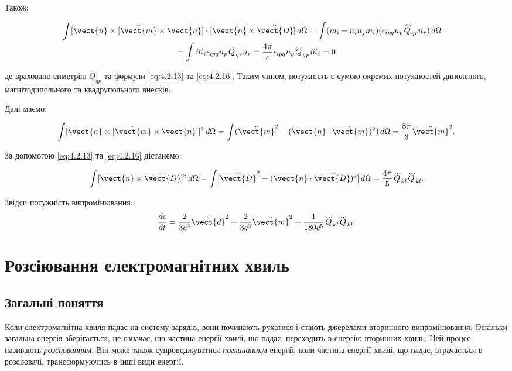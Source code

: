 Також:

\begin{multline*}
\int [\vect{n} \times [\ddot{\vect{m}}\times\vect{n}] \cdot [\vect{n} \times \dddot{\vect{D}}] \, d\Omega = \int (m_i - n_i n_j m_i)
(\epsilon_{ipq} n_p \tilde{\dddot{Q}}_{qr} n_r) \, d\Omega = \\ = \int \dddot{m}_i\epsilon_{ipq} n_p \dddot{Q}_{qr} n_r =
\frac{4\pi}c \epsilon_{ipq} n_p \dddot{Q}_{qp}\dddot{m}_i = 0
\end{multline*}

де враховано симетрію \( Q_{qp} \) та формули \eqref{eq:4.2.13} та \eqref{eq:4.2.16}. Таким чином, потужність є сумою окремих потужностей дипольного,
магнітодипольного та
квадрупольного внесків.

Далі маємо:

\begin{equation*}
\int [\vect{n} \times [\ddot{\vect{m}}\times\vect{n}]]^2 \, d\Omega = \int (\ddot{\vect{m}}^2 - (\vect{n} \cdot \ddot{\vect{m}})^2) \, d\Omega =
\frac{8\pi}{3} \ddot{\vect{m}}^2.
\end{equation*}

За допомогою \eqref{eq:4.2.13} та \eqref{eq:4.2.16}  дістанемо:

\begin{equation*}
\int [\vect{n} \times \dddot{\vect{D}}]^2 \, d\Omega = \int [\dddot{\vect{D}}^2 - (\vect{n} \cdot \dddot{\vect{D}})^2] \, d\Omega = \frac{4\pi}{5}
\dddot{Q}_{kl} \dddot{Q}_{kl}.
\end{equation*}

Звідси потужність випромінювання:
\begin{equation*}
    \frac{d\epsilon}{dt} = \frac2{3c^3}\ddot{\vect{d}}^2+
    \frac2{3c^3}\ddot{\vect{m}}^2+
    \frac1{180c^5}\dddot{Q}_{kl} \dddot{Q}_{kl}.
\end{equation*}

\section{Розсіювання електромагнітних хвиль}

\subsection*{Загальні поняття}

Коли електромагнітна хвиля падає на систему зарядів, вони починають рухатися і стають джерелами вторинного випромінювання. Оскільки загальна енергія
зберігається, це означає, що частина енергії хвилі, що падає, переходить в енергію вторинних хвиль. Цей процес називають \textit{розсіюванням}. Він може
також супроводжуватися \textit{поглинанням} енергії, коли частина енергії хвилі, що падає, втрачається в розсіювачі, трансформуючись в інші види енергії.

